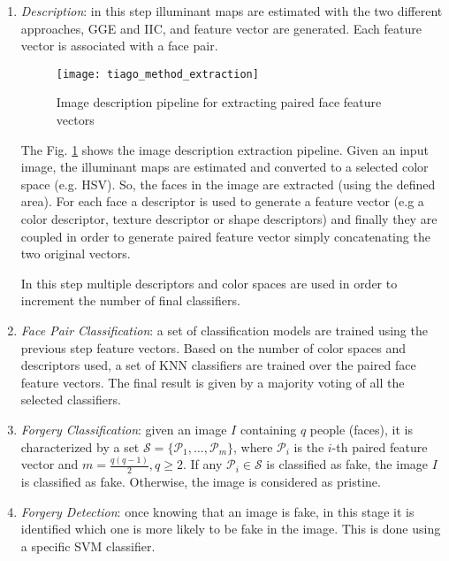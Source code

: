 \begin{enumerate}
\item \emph{Description}: in this step illuminant maps are estimated with the two different approaches, GGE and IIC, and feature vector are generated. Each feature vector is associated with a face pair.
\begin{figure}[h!]
  \centering
    \texttt{[image: tiago\_method\_extraction]}
    \caption{Image description pipeline for extracting paired face feature vectors}
    \label{fig:tiago_method_extraction}
\end{figure}

The Fig. \ref{fig:tiago_method_extraction} shows the image description extraction pipeline. Given an input image, the illuminant maps are estimated and converted to a selected color space (e.g. HSV). So, the faces in the image are extracted (using the defined area). For each face a descriptor is used to generate a feature vector (e.g a color descriptor, texture descriptor or shape descriptors) and finally they are coupled in order to generate paired feature vector simply concatenating the two original vectors.

In this step multiple descriptors and color spaces are used in order to increment the number of final classifiers.

\item \emph{Face Pair Classification}: a set of classification models are trained using the previous step feature vectors. Based on the number of color spaces and descriptors used, a set of KNN classifiers are trained over the paired face feature vectors. The final result is given by a majority voting of all the selected classifiers.

\item \emph{Forgery Classification}: given an image $I$ containing $q$ people (faces), it is characterized by a set $\mathcal{S} = \{\mathcal{P}_1, \ldots, \mathcal{P}_m \}$, where $\mathcal{P}_i$ is the $i$-th paired feature vector and $m = \frac{q(q-1)}{2}, q \geq 2$. If any $\mathcal{P}_i \in \mathcal{S}$ is classified as fake, the image $I$ is classified as fake. Otherwise, the image is considered as pristine.

\item \emph{Forgery Detection}: once knowing that an image is fake, in this stage it is identified which one is more likely to be fake in the image. This is done using a specific SVM classifier.   
\end{enumerate}

